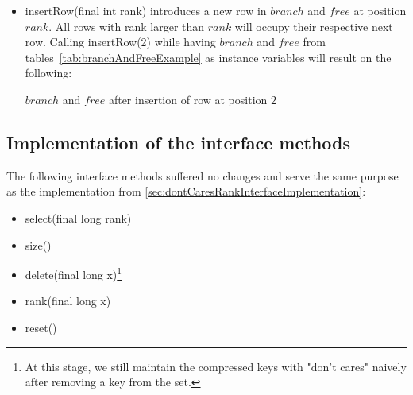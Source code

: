 \begin{itemize}
    \item
    {\ttfamily insertRow(final int rank)} introduces a new row in $branch$ and $free$ at position $rank$. All rows with rank larger than $rank$ will occupy their respective next row. Calling {\ttfamily insertRow(2)} while having $branch$ and $free$ from tables~\ref{tab:branchAndFreeExample} as instance variables will result on the following:
    \begin{table}[H]
    \centering
    
    \caption{$branch$ and $free$ after insertion of row at position $2$}
    \label{tab:branchAndFreeAfterRowInsertion}
    \end{table}
\end{itemize}

\subsection{Implementation of the interface methods}  \label{sec:dontCaresInsertInterfaceImplementation}

The following interface methods suffered no changes and serve the same purpose as the implementation from \ref{sec:dontCaresRankInterfaceImplementation}:
\begin{itemize}
    \item
    {\ttfamily select(final long rank)}
    
    \item
    {\ttfamily size()}
    
    \item
    {\ttfamily delete(final long x)}\footnote{At this stage, we still maintain the compressed keys with "don't cares" naively after removing a key from the set.}
    
    \item
    {\ttfamily rank(final long x)}
    
    \item
    {\ttfamily reset()}
\end{itemize}

